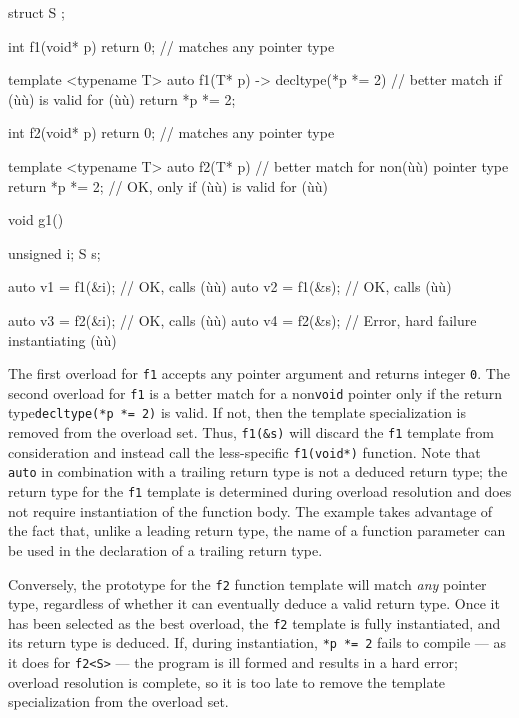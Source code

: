 \begin{emcppslisting}[emcppsstandards={c++14}]
struct S { };

int f1(void* p) { return 0; }       // matches any pointer type

template <typename T>
auto f1(T* p) -> decltype(*p *= 2)  // better match if (ù{\codeincomments{*=}}ù) is valid for (ù{}ù)
{
    return *p *= 2;
}

int f2(void* p) { return 0; }       // matches any pointer type

template <typename T>
auto f2(T* p)                       // better match for non(ù{}ù) pointer type
{
    return *p *= 2;                 // OK, only if (ù{\codeincomments{*=}}ù) is valid for (ù{}ù)
}

void g1()
{
    unsigned i;
    S        s;

    auto v1 = f1(&i);  // OK, calls (ù{}ù)
    auto v2 = f1(&s);  // OK, calls (ù{}ù)

    auto v3 = f2(&i);  // OK, calls (ù{}ù)
    auto v4 = f2(&s);  // Error, hard failure instantiating (ù{}ù)
}
\end{emcppslisting}
    

\noindent The first overload for \lstinline!f1! accepts any pointer argument and
returns integer \lstinline!0!. The second overload for \lstinline!f1! is a
better match for a non\lstinline!void! pointer only if the return type\linebreak[4]
\lstinline!decltype(*p!~\lstinline!*=!~\lstinline!2)! is valid. If not, then the
template specialization is removed from the overload set. Thus,
\lstinline!f1(&s)! will discard the \lstinline!f1! template from
consideration and instead call the less-specific \lstinline!f1(void*)!
function. Note that \lstinline!auto! in combination with a trailing return
type is not a deduced return type; the return type for the \lstinline!f1!
template is determined during overload resolution and does not require
instantiation of the function body. The example takes advantage of the
fact that, unlike a leading return type, the name of a function
parameter can be used in the declaration of a trailing return type.

Conversely, the prototype for the \lstinline!f2! function template will
match \emph{any} pointer type, regardless of whether it can eventually
deduce a valid return type. Once it has been selected as the best
overload, the \lstinline!f2! template is fully instantiated, and its return
type is deduced. If, during instantiation,
\lstinline!*p!~\lstinline!*=!~\lstinline!2! fails to compile --- as it does for
\lstinline!f2<S>! --- the program is ill formed and results in a hard
error; overload resolution is complete, so it is too late to remove the
template specialization from the overload set.

